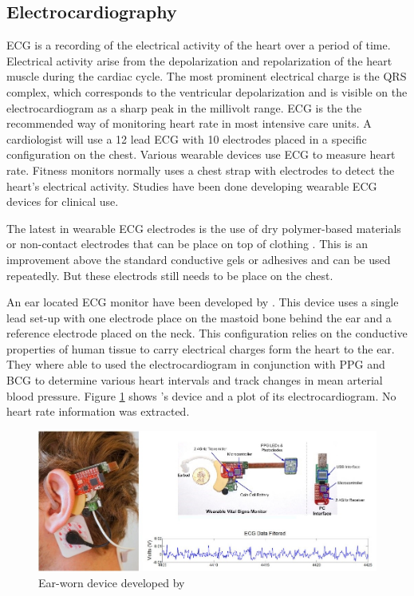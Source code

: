 \subsection{Electrocardiography}
ECG is a recording of the electrical activity of the heart over a period of time. Electrical activity arise from the depolarization and repolarization of the heart muscle during the cardiac cycle. The most prominent electrical charge is the QRS complex, which corresponds to the ventricular depolarization and is visible on the electrocardiogram as a sharp peak in the millivolt range. ECG is the the recommended way of monitoring heart rate in most intensive care units. A cardiologist will use a 12 lead ECG with 10 electrodes placed in a specific configuration on the chest. Various wearable devices use ECG to measure heart rate. Fitness monitors normally uses a chest strap with electrodes to detect the heart's electrical activity. Studies have been done developing wearable ECG devices for clinical use.

\medskip
The latest in wearable ECG electrodes is the use of dry polymer-based materials \citep{wang2010wearable} or non-contact electrodes that can be place on top of clothing \citep{lin2013development}. This is an improvement above the standard conductive gels or adhesives and can be used repeatedly. But these electrods still needs to be place on the chest.

\medskip
An ear located ECG monitor have been developed by \cite{winokur2012wearable}. This device uses a single lead set-up with one electrode place on the mastoid bone behind the ear and a reference electrode placed on the neck. This configuration relies on the conductive properties of human tissue to carry electrical charges form the heart to the ear. They where able to used the electrocardiogram in conjunction with PPG and BCG to determine various heart intervals and track changes in mean arterial blood pressure. Figure \ref{fig:Winokur} shows \cite{winokur2012wearable}'s device and a plot of its electrocardiogram. No heart rate information was extracted.

\medskip

\begin{figure}[hb]
   \centering
   \includegraphics[scale=0.5]{figs/Winokur}
   \caption{Ear-worn device developed by \cite{winokur2012wearable}}
   \label{fig:Winokur}
\end{figure}


